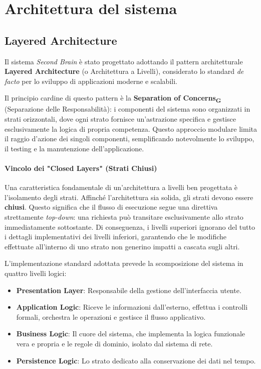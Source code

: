 \documentclass[11pt,a4paper]{article}
\newcommand{\gls}[1]{#1\textsubscript{G}}
\begin{document}
\newpage

\section{Architettura del sistema}
\subsection{Layered Architecture}
Il sistema \textit{Second Brain} è stato progettato adottando il pattern architetturale \textbf{Layered Architecture} (o Architettura a Livelli), considerato lo standard \textit{de facto} per lo sviluppo di applicazioni moderne e scalabili.

Il principio cardine di questo pattern è la \textbf{\gls{Separation of Concerns}} (Separazione delle Responsabilità): i componenti del sistema sono organizzati in strati orizzontali, dove ogni strato fornisce un'astrazione specifica e gestisce esclusivamente la logica di propria competenza. Questo approccio modulare limita il raggio d'azione dei singoli componenti, semplificando notevolmente lo sviluppo, il testing e la manutenzione dell'applicazione.

\paragraph{Vincolo dei "Closed Layers" (Strati Chiusi)}
Una caratteristica fondamentale di un'architettura a livelli ben progettata è l'isolamento degli strati. Affinché l'architettura sia solida, gli strati devono essere \textbf{chiusi}. Questo significa che il flusso di esecuzione segue una direttiva strettamente \textit{top-down}: una richiesta può transitare esclusivamente allo strato immediatamente sottostante. Di conseguenza, i livelli superiori ignorano del tutto i dettagli implementativi dei livelli inferiori, garantendo che le modifiche effettuate all'interno di uno strato non generino impatti a cascata sugli altri.

L'implementazione standard adottata prevede la scomposizione del sistema in quattro livelli logici:
\begin{itemize}
    \item \textbf{Presentation Layer}: Responsabile della gestione dell'interfaccia utente.
    \item \textbf{Application Logic}: Riceve le informazioni dall'esterno, effettua i controlli formali, orchestra le operazioni e gestisce il flusso applicativo.
    \item \textbf{Business Logic}: Il cuore del sistema, che implementa la logica funzionale vera e propria e le regole di dominio, isolato dal sistema di rete.
    \item \textbf{Persistence Logic}: Lo strato dedicato alla conservazione dei dati nel tempo.
\end{itemize}
\end{document}
